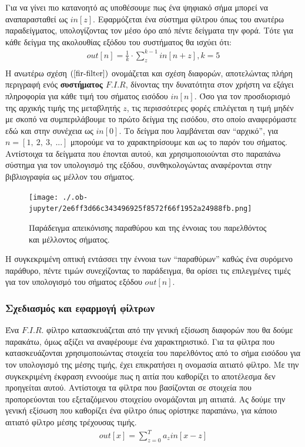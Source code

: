 \documentclass[breaklines=true, 12pt]{article}
\begin{document}
{{{Για να γίνει πιο κατανοητό ας υποθέσουμε πως ένα ψηφιακό σήμα μπορεί να αναπαρασταθεί
ως \(in[z]\). Εφαρμόζεται ένα σύστημα φίλτρου όπως του ανωτέρω παραδείγματος, υπολογίζοντας
τον μέσο όρο από πέντε δείγματα την φορά. Τότε για κάθε δείγμα της ακολουθίας εξόδου του
συστήματος θα ισχύει ότι:
\begin{equation}
\label{fir-filter}
\begin{align}
out[n] = \frac{1}{k} \cdot \sum_{z}^{{k-1}}in[n+z], k=5 \\
\end{align}
\end{equation}
Η ανωτέρω σχέση \((\ref{fir-filter})\) ονομάζεται και σχέση διαφορών, αποτελώντας πλήρη περιγραφή ενός \textbf{συστήματος
\(F.I.R\)}, δίνοντας την δυνατότητα στον χρήστη να εξάγει πληροφορία για κάθε τιμή του σήματος
εισόδου \(in[n]\). Όσο για τον προσδιορισμό της αρχικής τιμής της μεταβλητής \(z\), τις περισσότερες
φορές επιλέγεται η τιμή μηδέν με σκοπό να συμπεριλάβουμε το πρώτο δείγμα της εισόδου,
στο οποίο αναφερόμαστε εδώ και στην συνέχεια ως \(in[0]\). Το δείγμα που λαμβάνεται σαν “αρχικό”,
για \(n = [1,\ 2,\ 3,\ ...]\) μπορούμε να το χαρακτηρίσουμε και ως το παρόν του σήματος. Αντίστοιχα τα
δείγματα που έπονται αυτού, και χρησιμοποιούνται στο παραπάνω σύστημα για τον υπολογισμό
της εξόδου, συνθηκολογώντας αναφέρονται στην βιβλιογραφία ως μέλλον του σήματος.

\begin{figure}[H]
\centering
\texttt{[image: ./.ob-jupyter/2e6ff3d66c343496925f8572f66f1952a24988fb.png]}
\caption{\label{fig_explaining_future}Παράδειγμα απεικόνισης παραθύρου και της έννοιας του παρελθόντος και μέλλοντος σήματος.}
\end{figure}

Η συγκεκριμένη οπτική εντάσσει την έννοια των “παραθύρων” καθώς ένα συρόμενο παράθυρο, πέντε
τιμών συνεχίζοντας το παράδειγμα, θα ορίσει τις επιλεγμένες τιμές για τον υπολογισμό του
σήματος εξόδου \(out[n]\).
\subsubsection{Σχεδιασμός και εφαρμογή φίλτρων}
\label{sec:org95fbaf8}
Ένα \(F.I.R.\) φίλτρο κατασκευάζεται από την γενική εξίσωση διαφορών που θα δούμε παρακάτω,
όμως αξίζει να αναφέρουμε ένα χαρακτηριστικό. Για τα φίλτρα που κατασκευάζονται
χρησιμοποιώντας στοιχεία του παρελθόντος από το σήμα εισόδου για τον υπολογισμό της μέσης τιμής,
έχει επικρατήσει η ονομασία αιτιατό φίλτρο. Με την συγκεκριμένη έκφραση εννοούμε πως
η αιτία που καθορίζει το αποτέλεσμα δεν προηγείται αυτού. Αντίστοιχα τα φίλτρα που
βασίζονται σε στοιχεία που προπορεύονται του εξεταζόμενου στοιχείου ονομάζονται μη
αιτιατά. Ας δούμε την γενική εξίσωση που καθορίζει ένα φίλτρο όπως ορίστηκε παραπάνω,
για κάποιο αιτιατό φίλτρο μέσης τρέχουσας τιμής.
\begin{equation}
\begin{align}
out[x] = \sum_{z=0}^{{T}} a_{z} in[x-z] \\
\end{align}
\end{equation}

}}}
\end{document}
